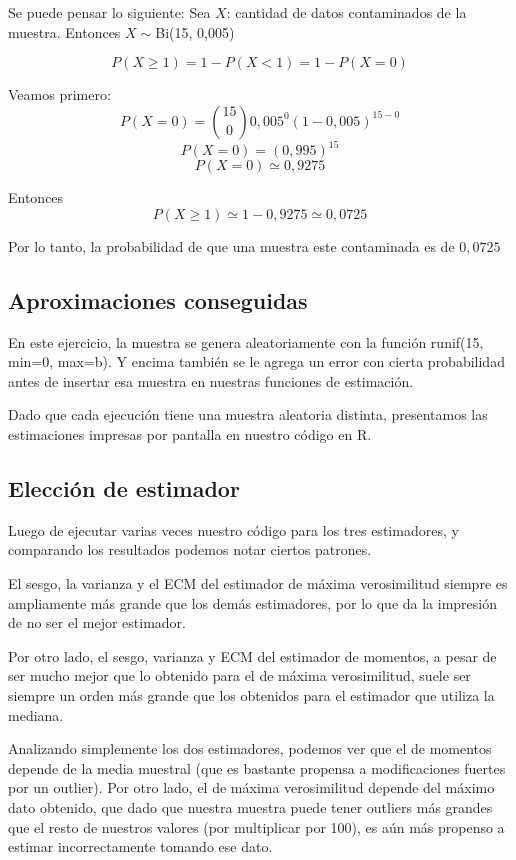 \documentclass[a4paper]{article}
\begin{document}
Se puede pensar lo siguiente: \newline \newline
Sea $X$: cantidad de datos contaminados de la muestra. \newline
Entonces $X\sim$Bi(15, 0,005)

\[
P(X \geq 1) = 1 - P(X < 1) = 1 - P(X = 0)
\]

Veamos primero: 
\[
P(X = 0) = {{15}\choose{0}} 0,005^{0} (1-0,005)^{15-0}
\]
\[
P(X = 0) = (0,995)^{15}
\]
\[
P(X = 0) \simeq 0,9275
\]

Entonces 
\[
P(X \geq 1) \simeq 1 - 0,9275 \simeq 0,0725
\]

Por lo tanto, la probabilidad de que una muestra este contaminada es de $0,0725$

\subsection{Aproximaciones conseguidas}
En este ejercicio, la muestra se genera aleatoriamente con la función runif(15, min=0, max=b). Y encima también se le agrega un error con cierta probabilidad antes de insertar esa muestra en nuestras funciones de estimación. 

Dado que cada ejecución tiene una muestra aleatoria distinta, presentamos las estimaciones impresas por pantalla en nuestro código en R.

\subsection{Elección de estimador}
Luego de ejecutar varias veces nuestro código para los tres estimadores, y comparando los resultados podemos notar ciertos patrones. 

El sesgo, la varianza y el ECM del estimador de máxima verosimilitud siempre es ampliamente más grande que los demás estimadores, por lo que da la impresión de no ser el mejor estimador. 

Por otro lado, el sesgo, varianza y ECM del estimador de momentos, a pesar de ser mucho mejor que lo obtenido para el de máxima verosimilitud, suele ser siempre un orden más grande que los obtenidos para el estimador que utiliza la mediana. 

Analizando simplemente los dos estimadores, podemos ver que el de momentos depende de la media muestral (que es bastante propensa a modificaciones fuertes por un outlier). Por otro lado, el de máxima verosimilitud depende del máximo dato obtenido, que dado que nuestra muestra puede tener outliers más grandes que el resto de nuestros valores (por multiplicar por 100), es aún más propenso a estimar incorrectamente tomando ese dato. 
\end{document}
